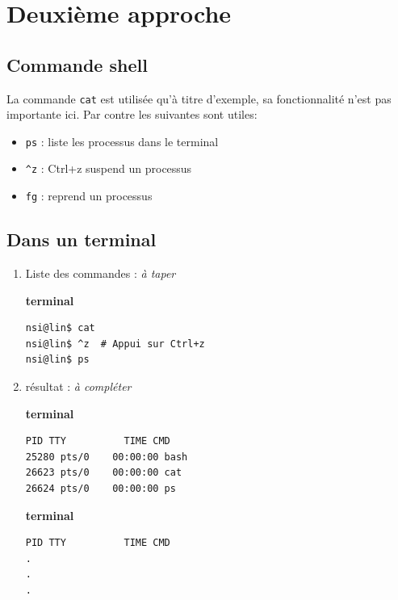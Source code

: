 \documentclass[10pt,french,A4]{article}
\theoremstyle{plain}
\newenvironment{code}[1]{%
    \begin{bclogo}[couleur=backcolour, couleurTexte=black ,couleurBord=blue ,couleurBarre=black, ombre=false,epBord=0.9,logo=\#,arrondi=0.1]{{\bfseries #1}}%
    }%
    {%
    \end{bclogo}
}%
\begin{document}
\hypertarget{deuxiuxe8me-approche}{%
\section{Deuxième approche}\label{deuxiuxe8me-approche}}
\begin{multicols}{2}
    \hypertarget{commande-shell}{%
        \subsection{Commande shell}\label{commande-shell}}
    
    La commande \texttt{cat} est utilisée qu'à titre d'exemple, sa
    fonctionnalité n'est pas importante ici. Par contre les suivantes sont
    utiles:
    
    \begin{itemize}
        \item \texttt{ps} : liste les processus dans le terminal
        \item \texttt{\^{}z} : Ctrl+z suspend un processus
        \item \texttt{fg} : reprend un processus
    \end{itemize}

\subsection{Dans un terminal}
\begin{enumerate}   
    \item  Liste des commandes : \textit{à taper}
        \begin{code}{terminal}
            \begin{verbatim}
nsi@lin$ cat
nsi@lin$ ^z  # Appui sur Ctrl+z
nsi@lin$ ps
            \end{verbatim}
        \end{code}
        \item résultat : \textit{à compléter}
  \ifProf
 \begin{code}{terminal}
        \begin{verbatim}
PID TTY          TIME CMD
25280 pts/0    00:00:00 bash
26623 pts/0    00:00:00 cat
26624 pts/0    00:00:00 ps
        \end{verbatim}
\end{code}
  \else
     \begin{code}{terminal}
        \begin{verbatim}
PID TTY          TIME CMD
.
.
.
\end{verbatim}
\end{code}
\fi


\end{enumerate}
\end{multicols}
\end{document}
